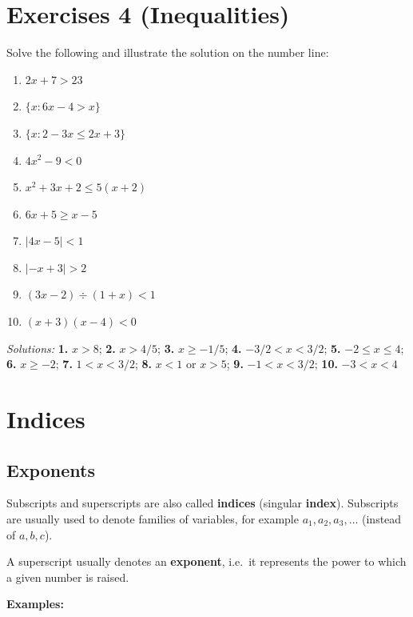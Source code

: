 \documentclass[
  12pt,
  oneside]{book}
\theoremstyle{definition}
\theoremstyle{definition}
\theoremstyle{definition}
\theoremstyle{definition}
\theoremstyle{remark}
\begin{document}
\hypertarget{exercises-4-inequalities}{%
\chapter*{Exercises 4 (Inequalities)}\label{exercises-4-inequalities}}

Solve the following and illustrate the solution on the number line:

\begin{enumerate}
\def\labelenumi{\arabic{enumi}.}
\item
  \(2x+7>23\)
\item
  \(\{x: 6x-4>x\}\)
\item
  \(\{x: 2-3x \leq 2x+3\}\)
\item
  \(4x^2-9<0\)
\item
  \(x^2+3x+2\leq 5(x+2)\)
\item
  \(6x+5\geq x-5\)
\item
  \(|4x-5|<1\)
\item
  \(|-x+3|>2\)
\item
  \((3x-2)\div(1+x)<1\)
\item
  \((x+3)(x-4)<0\)
\end{enumerate}

\emph{Solutions:}
\textbf{1.} \(x>8\);
\textbf{2.} \(x>4/5\);
\textbf{3.} \(x\geq-1/5\);
\textbf{4.} \(-3/2< x< 3/2\);
\textbf{5.} \(-2\leq x\leq4\);
\textbf{6.} \(x\geq-2\);
\textbf{7.} \(1<x<3/2\);
\textbf{8.} \(x<1\) or \(x>5\);
\textbf{9.} \(-1<x<3/2\);
\textbf{10.} \(-3<x<4\)

\hypertarget{indices}{%
\chapter{Indices}\label{indices}}

\hypertarget{exponents}{%
\section{Exponents}\label{exponents}}

Subscripts and superscripts are also called \textbf{indices} (singular \textbf{index}). Subscripts are usually used to denote families of variables, for example \(a_1,a_2,a_3,\dots\) (instead of \(a,b,c\)).

A superscript usually denotes an \textbf{exponent}, i.e.~it represents the power to which a given number is raised.

\textbf{Examples:}
\end{document}
